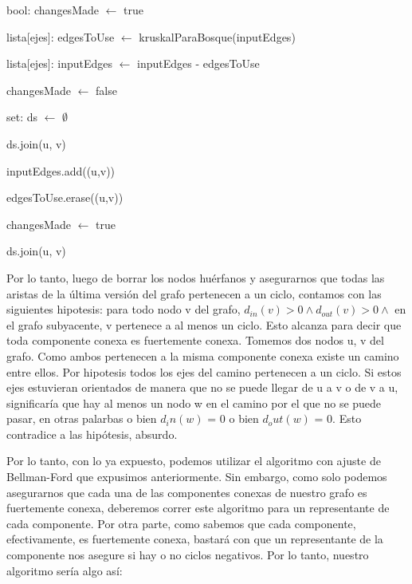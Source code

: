 \begin{algorithm}[H]
		\NoCaptionOfAlgo
		\caption{}
		
		bool: changesMade $\leftarrow$ true
		
		lista[ejes]: edgesToUse $\leftarrow$ kruskalParaBosque(inputEdges)

		lista[ejes]: inputEdges $\leftarrow$ inputEdges - edgesToUse

		{
			changesMade $\leftarrow$ false

			set: ds $\leftarrow$ $\emptyset$

			{
				ds.join(u, v)
			}

			{
					{
						inputEdges.add((u,v))

						edgesToUse.erase((u,v))

						changesMade $\leftarrow$ true
					}
					{
						ds.join(u, v)
					}
			}



		}
	\end{algorithm}

Por lo tanto, luego de borrar los nodos huérfanos y asegurarnos que todas las aristas de la última versión del grafo pertenecen a un ciclo, contamos con las siguientes hipotesis: para todo nodo v del grafo, $d_{in} (v) > 0 \land d_{out} (v) > 0 \land$ en el grafo subyacente, v pertenece a al menos un ciclo. Esto alcanza para decir que toda componente conexa es fuertemente conexa. Tomemos dos nodos u, v del grafo. Como ambos pertenecen a la misma componente conexa existe un camino entre ellos. Por hipotesis todos los ejes del camino pertenecen a un ciclo. Si estos ejes estuvieran orientados de manera que no se puede llegar de u a v o de v a u, significaría que hay al menos un nodo w en el camino por el que no se puede pasar, en otras palarbas o bien $d_in(w)$ = 0 o bien $d_out(w)$ = 0. Esto contradice a las hipótesis, absurdo.

Por lo tanto, con lo ya expuesto, podemos utilizar el algoritmo con ajuste de Bellman-Ford que expusimos anteriormente. Sin embargo, como solo podemos asegurarnos que cada una de las componentes conexas de nuestro grafo es fuertemente conexa, deberemos correr este algoritmo para un representante de cada componente. Por otra parte, como sabemos que cada componente, efectivamente, es fuertemente conexa, bastará con que un representante de la componente nos asegure si hay o no ciclos negativos. Por lo tanto, nuestro algoritmo sería algo así:

